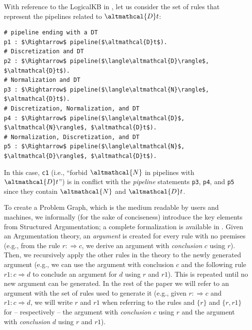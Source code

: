 \begin{example}
With reference to the LogicalKB in , let us consider the set of rules that represent the pipelines related to $\altmathcal{D}t$:
\begin{lstlisting}[mathescape=true]
# pipeline ending with a DT
p1 : $\Rightarrow$ pipeline($\altmathcal{D}t$).
# Discretization and DT
p2 : $\Rightarrow$ pipeline($\langle\altmathcal{D}\rangle$, $\altmathcal{D}t$).
# Normalization and DT
p3 : $\Rightarrow$ pipeline($\langle\altmathcal{N}\rangle$, $\altmathcal{D}t$).
# Discretization, Normalization, and DT
p4 : $\Rightarrow$ pipeline($\langle\altmathcal{D}$, $\altmathcal{N}\rangle$, $\altmathcal{D}t$).
# Normalization, Discretization, and DT
p5 : $\Rightarrow$ pipeline($\langle\altmathcal{N}$, $\altmathcal{D}\rangle$, $\altmathcal{D}t$).
\end{lstlisting}
In this case, \texttt{c1} (i.e., ``forbid $\altmathcal{N}$ in pipelines with $\altmathcal{D}t$'') is in conflict with the \emph{pipeline} statements \texttt{p3}, \texttt{p4}, and \texttt{p5} since they contain $\altmathcal{N}$ and $\altmathcal{D}t$.
\label{ex:conflict}
\end{example}

To create a Problem Graph, which is the medium readable by users and machines, we informally (for the sake of conciseness) introduce the key elements from Structured Argumentation; a complete formalization is available in \cite{Modgil2014aspic+}.
Given an Argumentation theory, an \emph{argument} is created for every rule with no premises (e.g., from the rule $r : \Rightarrow c$, we derive an argument with \emph{conclusion} $c$ using $r$).
Then, we recursively apply the other rules in the theory to the newly generated argument (e.g., we can use the argument with conclusion $c$ and the following rule $r1 : c \Rightarrow d$ to conclude an argument for $d$ using $r$ and $r1$).
This is repeated until no new argument can be generated.
In the rest of the paper we will refer to an argument with the set of rules used to generate it (e.g., given $r : \Rightarrow c$ and $r1 : c \Rightarrow d$, we will write $r$ and $r1$ when referring to the rules and $\{r\}$ and $\{r, r1\}$ for -- respectively -- the argument with \emph{conclusion} $c$ using $r$ and the argument with \emph{conclusion} $d$ using $r$ and $r1$).

